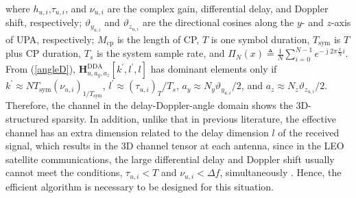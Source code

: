 \documentclass[conference]{IEEEtran}
\begin{document}
    where $h_{u,i}$,$\tau_{u,i}$, and $\nu_{u,i}$ are the complex gain, differential delay, and Doppler shift, respectively; $\vartheta_{y_{u,i}}$ and $\vartheta_{z_{u,i}}$ are the directional cosines along the $y$- and $z$-axis of UPA, respectively; $M_{\text{cp}}$ is the length of CP, $T$ is one symbol duration, $T_{\text{sym}}$ is $T$ plus CP duration, $T_s$ is the system sample rate, and $\Pi_N(x)\triangleq\frac{1}{N} \sum_{i=0}^{N-1} e^{-\bar{\jmath} 2 \pi \frac{x}{N} i}$. From (\ref{angleD}), $\mathbf H_{u, a_y,a_z}^{\mathrm{DDA}}[k^{\prime}, l^{\prime}, l]$ has dominant elements only if $k^{\prime} \approx NT_{\text{sym}}(\nu_{u,i})_{1/T_{\text{sym}}}$, $l^{\prime} \approx (\tau_{u,i})_T/T_s$, $a_y \approx N_y\vartheta_{y_{u,i}}/2$, and $a_z \approx N_z\vartheta_{z_{u,i}}/2$. Therefore, the channel in the delay-Doppler-angle domain shows the 3D-structured sparsity\cite{smm1}. In addition, unlike that in previous literature\cite{s22}, the effective channel has an extra dimension related to the delay dimension $l$ of the received signal, which results in the 3D channel tensor at each antenna,
    since in the LEO satellite communications, the large differential delay and Doppler shift usually cannot meet the conditions, $\tau_{u,i} < T$ and $\nu_{u,i} < \Delta f$, simultaneously \cite{3gpp}. 
     Hence, the efficient algorithm is necessary to be designed for this situation.
    \vspace{-0.1cm}
\end{document}

